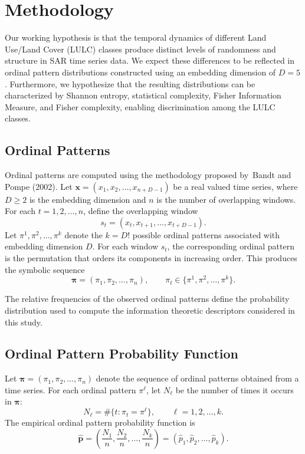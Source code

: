 \section{Methodology}\label{methodology}

Our working hypothesis is that the temporal dynamics of different Land Use/Land Cover (LULC) classes produce distinct levels of randomness and structure in SAR time series data. We expect these differences to be reflected in ordinal pattern distributions constructed using an embedding dimension of \(D=5\). Furthermore, we hypothesize that the resulting distributions can be characterized by Shannon entropy,
statistical complexity, Fisher Information Measure, and Fisher complexity, enabling discrimination among the LULC classes.

\subsection{Ordinal Patterns}\label{ordinal-patterns}

Ordinal patterns are computed using the methodology proposed by~Bandt and Pompe (2002)\cite{PhysRevLett.88.174102}. Let \(\mathbf{x} = (x_1, x_2, \dots, x_{n+D-1})\) be a
real valued time series, where \(D \ge 2\) is the embedding dimension and \(n\) is the number of overlapping windows. For each \(t = 1,2,\dots,n\), define the overlapping window 
\[
s_t = (x_t, x_{t+1}, \dots, x_{t+D-1}).
\] 
Let \(\pi^1, \pi^2, \dots, \pi^k\) denote the \(k = D!\) possible ordinal patterns associated with embedding dimension \(D\). For each window \(s_t\), the corresponding ordinal pattern is the permutation
that orders its components in increasing order. This produces the symbolic sequence 
\[
\boldsymbol{\pi} = (\pi_1, \pi_2, \dots, \pi_n), \qquad \pi_t \in \{\pi^1,\pi^2,\dots,\pi^k\}.
\]

The relative frequencies of the observed ordinal patterns define the probability distribution used to compute the information theoretic descriptors considered in this study.

\subsection{Ordinal Pattern Probability Function}\label{ordinal-pattern-probability-function}

Let \(\boldsymbol{\pi} = (\pi_1, \pi_2, \dots, \pi_n)\) denote the sequence of ordinal patterns obtained from a time series. For each ordinal pattern \(\pi^{\ell}\), let \(N_\ell\) be the number of times it
occurs in \(\boldsymbol{\pi}\): 
\[
N_\ell = \#\{t : \pi_t = \pi^{\ell}\}, \qquad \ell = 1,2,\dots,k.
\] 
The empirical ordinal pattern probability function is 
\[
\widehat{\mathbf{p}} = \left(\frac{N_1}{n}, \frac{N_2}{n}, \dots, \frac{N_k}{n}\right) = (\widehat{p}_{1}, \widehat{p}_{2}, \dots, \widehat{p}_{k}).
\]

